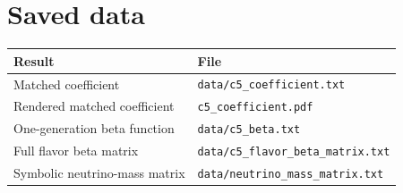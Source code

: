 \documentclass[10pt]{article}
\begin{document}
\section{Saved data}
\begin{center}
\begin{tabular}{l l}
\toprule
Result & File \\
\midrule
Matched coefficient & \texttt{data/c5\_coefficient.txt} \\
Rendered matched coefficient & \texttt{c5\_coefficient.pdf} \\
One-generation beta function & \texttt{data/c5\_beta.txt} \\
Full flavor beta matrix & \texttt{data/c5\_flavor\_beta\_matrix.txt} \\
Symbolic neutrino-mass matrix & \texttt{data/neutrino\_mass\_matrix.txt} \\
\bottomrule
\end{tabular}
\end{center}
\end{document}
